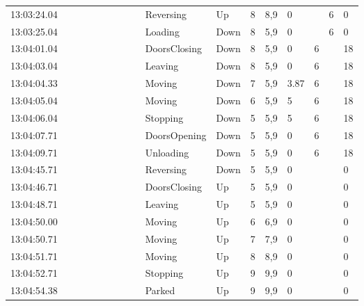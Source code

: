 \documentclass{UoYCSproject}
\begin{document}
\begin{landscape}
\begin{longtable}{l || l | l | l | l | l | l | l | l || l | l | l | l | l | l | l | l}
	13:03:24.04 &  &  &  &  &  &  &  &  & Reversing & Up & 8 & 8,9 & 0 &  & 6 & 0 \\
	13:03:25.04 &  &  &  &  &  &  &  &  & Loading & Down & 8 & 5,9 & 0 &  & 6 & 0 \\
	13:04:01.04 &  &  &  &  &  &  &  &  & DoorsClosing & Down & 8 & 5,9 & 0 & 6 &  & 18 \\
	13:04:03.04 &  &  &  &  &  &  &  &  & Leaving & Down & 8 & 5,9 & 0 & 6 &  & 18 \\
	13:04:04.33 &  &  &  &  &  &  &  &  & Moving & Down & 7 & 5,9 & 3.87 & 6 &  & 18 \\
	13:04:05.04 &  &  &  &  &  &  &  &  & Moving & Down & 6 & 5,9 & 5 & 6 &  & 18 \\
	13:04:06.04 &  &  &  &  &  &  &  &  & Stopping & Down & 5 & 5,9 & 5 & 6 &  & 18 \\
	13:04:07.71 &  &  &  &  &  &  &  &  & DoorsOpening & Down & 5 & 5,9 & 0 & 6 &  & 18 \\
	13:04:09.71 &  &  &  &  &  &  &  &  & Unloading & Down & 5 & 5,9 & 0 & 6 &  & 18 \\
	13:04:45.71 &  &  &  &  &  &  &  &  & Reversing & Down & 5 & 5,9 & 0 &  &  & 0 \\
	13:04:46.71 &  &  &  &  &  &  &  &  & DoorsClosing & Up & 5 & 5,9 & 0 &  &  & 0 \\
	13:04:48.71 &  &  &  &  &  &  &  &  & Leaving & Up & 5 & 5,9 & 0 &  &  & 0 \\
	13:04:50.00 &  &  &  &  &  &  &  &  & Moving & Up & 6 & 6,9 & 0 &  &  & 0 \\
	13:04:50.71 &  &  &  &  &  &  &  &  & Moving & Up & 7 & 7,9 & 0 &  &  & 0 \\
	13:04:51.71 &  &  &  &  &  &  &  &  & Moving & Up & 8 & 8,9 & 0 &  &  & 0 \\
	13:04:52.71 &  &  &  &  &  &  &  &  & Stopping & Up & 9 & 9,9 & 0 &  &  & 0 \\
	13:04:54.38 &  &  &  &  &  &  &  &  & Parked & Up & 9 & 9,9 & 0 &  &  & 0
\end{longtable}

\end{landscape}
\end{document}
